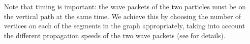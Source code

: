 \documentclass[../thesis-main/thesis-main]{subfiles}
\begin{document}
%  
%
%
%
%  
%  
% 
%  
%

Note that timing is important: the wave packets of the two particles must be on the vertical path at the same time. We achieve this by choosing the number of vertices on each of the segments in the graph appropriately, taking into account the different propagation speeds of the two wave packets (see  for details). 
\end{document}
